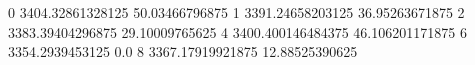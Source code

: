 0 3404.32861328125 50.03466796875
1 3391.24658203125 36.95263671875
2 3383.39404296875 29.10009765625
4 3400.400146484375 46.106201171875
6 3354.2939453125 0.0
8 3367.17919921875 12.88525390625
